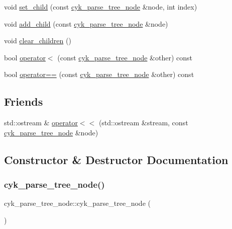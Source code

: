 \begin{DoxyCompactItemize}
\item 
void \mbox{\hyperlink{classcyk__parse__tree__node_a1d80891bbf2ceb1c0a7eb9042dc0c31b}{set\+\_\+child}} (const \mbox{\hyperlink{classcyk__parse__tree__node}{cyk\+\_\+parse\+\_\+tree\+\_\+node}} \&node, int index)
\item 
void \mbox{\hyperlink{classcyk__parse__tree__node_a5c84dbc3467938e28d3da5580b209970}{add\+\_\+child}} (const \mbox{\hyperlink{classcyk__parse__tree__node}{cyk\+\_\+parse\+\_\+tree\+\_\+node}} \&node)
\item 
void \mbox{\hyperlink{classcyk__parse__tree__node_a38b760ecf7aa2fa860847eed6819aedb}{clear\+\_\+children}} ()
\item 
bool \mbox{\hyperlink{classcyk__parse__tree__node_a49838a9041ce5c10f22fa14f5993723c}{operator$<$}} (const \mbox{\hyperlink{classcyk__parse__tree__node}{cyk\+\_\+parse\+\_\+tree\+\_\+node}} \&other) const
\item 
bool \mbox{\hyperlink{classcyk__parse__tree__node_aa3149c25b9a3f7b2403402633ca05de0}{operator==}} (const \mbox{\hyperlink{classcyk__parse__tree__node}{cyk\+\_\+parse\+\_\+tree\+\_\+node}} \&other) const
\end{DoxyCompactItemize}
\subsection*{Friends}
\begin{DoxyCompactItemize}
\item 
std\+::ostream \& \mbox{\hyperlink{classcyk__parse__tree__node_a6a338e8d2d8c83ce89dc81dec7f9cfb6}{operator$<$$<$}} (std\+::ostream \&stream, const \mbox{\hyperlink{classcyk__parse__tree__node}{cyk\+\_\+parse\+\_\+tree\+\_\+node}} \&node)
\end{DoxyCompactItemize}


\subsection{Constructor \& Destructor Documentation}
\mbox{\label{classcyk__parse__tree__node_aec49342697d8a2d6eec71ed65a02c11e}} 
\subsubsection{\texorpdfstring{cyk\_parse\_tree\_node()}{cyk\_parse\_tree\_node()}\hspace{0.1cm}{\footnotesize\ttfamily [1/3]}}
{\footnotesize\ttfamily cyk\+\_\+parse\+\_\+tree\+\_\+node\+::cyk\+\_\+parse\+\_\+tree\+\_\+node (\begin{DoxyParamCaption}{ }\end{DoxyParamCaption})\hspace{0.3cm}{\ttfamily [inline]}}

